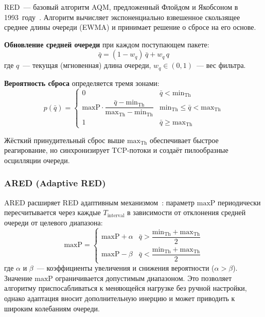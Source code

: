 \documentclass[12pt,a4paper]{article}
\begin{document}
RED~--- базовый алгоритм AQM, предложенный Флойдом и Якобсоном в 1993~году~\cite{floyd1993}. Алгоритм вычисляет экспоненциально взвешенное скользящее среднее длины очереди (EWMA) и принимает решение о сбросе на его основе.

\textbf{Обновление средней очереди} при каждом поступающем пакете:
\begin{equation}
\bar{q} = (1 - w_q)\,\bar{q} + w_q\,q
\end{equation}
где $q$~--- текущая (мгновенная) длина очереди, $w_q \in (0,1)$~--- вес фильтра.

\textbf{Вероятность сброса} определяется тремя зонами:
\begin{equation}
p(\bar{q}) = \begin{cases}
0 & \bar{q} < \mathrm{min}_{\mathrm{Th}} \\
\mathrm{maxP} \cdot \dfrac{\bar{q} - \mathrm{min}_{\mathrm{Th}}}{\mathrm{max}_{\mathrm{Th}} - \mathrm{min}_{\mathrm{Th}}} & \mathrm{min}_{\mathrm{Th}} \le \bar{q} < \mathrm{max}_{\mathrm{Th}} \\
1 & \bar{q} \ge \mathrm{max}_{\mathrm{Th}}
\end{cases}
\end{equation}

Жёсткий принудительный сброс выше $\mathrm{max}_{\mathrm{Th}}$ обеспечивает быстрое реагирование, но синхронизирует TCP-потоки и создаёт пилообразные осцилляции очереди.

\subsubsection{ARED (Adaptive RED)}

ARED расширяет RED адаптивным механизмом~\cite{floyd2001}: параметр $\mathrm{maxP}$ периодически пересчитывается через каждые $T_{\mathrm{interval}}$ в зависимости от отклонения средней очереди от целевого диапазона:
\begin{equation}
\mathrm{maxP} = \begin{cases}
\mathrm{maxP} + \alpha & \bar{q} > \dfrac{\mathrm{min}_{\mathrm{Th}} + \mathrm{max}_{\mathrm{Th}}}{2} \\[6pt]
\mathrm{maxP} - \beta & \bar{q} < \dfrac{\mathrm{min}_{\mathrm{Th}} + \mathrm{max}_{\mathrm{Th}}}{2}
\end{cases}
\end{equation}
где $\alpha$ и $\beta$~--- коэффициенты увеличения и снижения вероятности ($\alpha > \beta$). Значение $\mathrm{maxP}$ ограничивается допустимым диапазоном. Это позволяет алгоритму приспосабливаться к меняющейся нагрузке без ручной настройки, однако адаптация вносит дополнительную инерцию и может приводить к широким колебаниям очереди.
\end{document}
